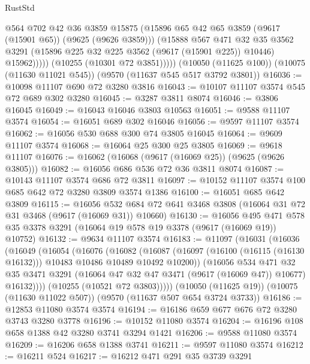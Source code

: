 \begin{lexlean}{RustStd}
\begin{coremodule}
                  @564
                  @702
                  @42
                  @36
                  @3859
                  @15875
                  (@15896 @65 @42 @65 @3859 (@9617 (@15901 @65)) (@9625 (@9626 @3859)))
                  (@15888
                    @567
                    @471
                    @32
                    @35
                    @3562
                    @3291
                    (@15896 @225 @32 @225 @3562 (@9617 (@15901 @225)) @10446)
                    @15962)))))
          (@10255 (@10301 @72 @3851)))))
    (@10050 (@11625 @100))
    (@10075 (@11630 @11021 @545))
    (@9570 (@11637 @545 @517 @3792 @3801))
@16036 := @10098 @11107 @690 @72 @3280 @3816
@16043 := @10107 @11107 @3574 @545 @72 @689 @302 @3280
@16045 := @3287 @3811 @8074
@16046 := @3806 @16045
@16049 := @16043 @16046 @3803 @10563
@16051 := @9588 @11107 @3574
@16054 := @16051 @689 @302 @16046
@16056 := @9597 @11107 @3574
@16062 := @16056 @530 @688 @300 @74 @3805 @16045
@16064 := @9609 @11107 @3574
@16068 := @16064 @25 @300 @25 @3805
@16069 := @9618 @11107
@16076 := @16062 (@16068 (@9617 (@16069 @25)) (@9625 (@9626 @3805)))
@16082 := @16056 @686 @536 @72 @36 @3811 @8074
@16087 := @10143 @11107 @3574 @686 @72 @3811
@16097 := @10152 @11107 @3574 @100 @685 @642 @72 @3280 @3809 @3574 @1386
@16100 := @16051 @685 @642 @3809
@16115 := @16056
    @532
    @684
    @72
    @641
    @3468
    @3808
    (@16064 @31 @72 @31 @3468 (@9617 (@16069 @31)) @10660)
@16130 := @16056
    @495
    @471
    @578
    @35
    @3378
    @3291
    (@16064 @19 @578 @19 @3378 (@9617 (@16069 @19)) @10752)
@16132 := @9634 @11107 @3574
@16183 := @11097
    (@16031
      (@16036
        (@16049
          (@16054
            (@16076
              (@16082
                (@16087
                  (@16097 (@16100 (@16115 (@16130 @16132))) @10483 @10486 @10489 @10492 @10200))
                (@16056
                  @534
                  @471
                  @32
                  @35
                  @3471
                  @3291
                  (@16064 @47 @32 @47 @3471 (@9617 (@16069 @47)) @10677)
                  @16132))))
          (@10255 (@10521 @72 @3803)))))
    (@10050 (@11625 @19))
    (@10075 (@11630 @11022 @507))
    (@9570 (@11637 @507 @654 @3724 @3733))
@16186 := @12853 @11080 @3574 @3574
@16194 := @16186 @659 @677 @676 @72 @3280 @3743 @3280 @3778
@16196 := @10152 @11080 @3574
@16204 := @16196 @108 @658 @1388 @42 @3280 @3741 @3294 @1421
@16206 := @9588 @11080 @3574
@16209 := @16206 @658 @1388 @3741
@16211 := @9597 @11080 @3574
@16212 := @16211 @524
@16217 := @16212 @471 @291 @35 @3739 @3291

\end{coremodule}
\end{lexlean}
